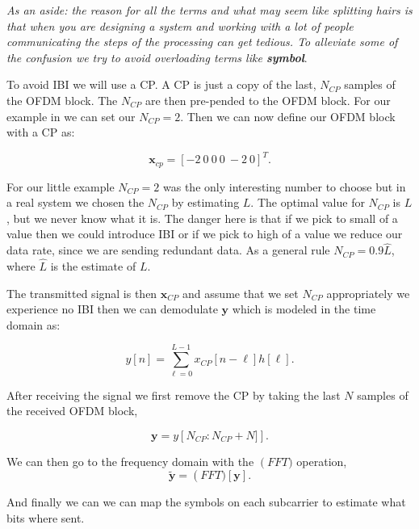 \emph{As an aside: the reason for all the terms and what may seem like splitting hairs is that when you are designing a system and working with a lot of people communicating the steps of the processing can get tedious. To alleviate some of the confusion we try to avoid overloading terms like \bf{symbol}}.

To avoid \ac{IBI} we will use a \ac{CP}. A \ac{CP} is just a copy of the last, $N_{CP}$ samples of the \ac{OFDM} block. The $N_{CP}$ are then pre-pended to the \ac{OFDM} block. For our example in  we can set our $N_{CP}=2$. Then we can now define our \ac{OFDM} block with a \ac{CP} as:

\begin{equation}
\mathbf{x}_{cp}= [-2~0~0~0~-2~0]^T.
\end{equation}

For our little example $N_{CP}=2$ was the only interesting number to choose but in a real system we chosen the $N_{CP}$ by estimating $L$. The optimal value for $N_{CP}$ is $L$, but we never know what it is. The danger here is that if we pick to small of a value then we could introduce \ac{IBI} or if we pick to high of a value we reduce our data rate, since we are sending redundant data. As a general rule $N_{CP}=0.9\hat{L}$, where $\hat{L}$ is the estimate of $L$.

The transmitted signal is then $\mathbf{x}_{CP}$ and assume that we set $N_{CP}$ appropriately we experience no \ac{IBI} then we can demodulate $\mathbf{y}$ which is modeled in the time domain as:

\begin{equation}
y[n] = \sum_{\ell=0}^{L-1}x_{CP}[n-\ell]h[\ell].
\end{equation}
\noindent

After receiving the signal we first remove the \ac{CP} by taking the last $N$ samples of the received \ac{OFDM} block,

\begin{equation}
\mathbf{y} = y\left[N_{CP}:N_{CP}+N]\right].
\end{equation}
\noindent

We can then go to the frequency domain with the $\operatorname(FFT)$ operation,
\begin{equation}
\label{eq:rxfft}
\tilde{\mathbf{y}} = \operatorname(FFT)\left[\mathbf{y}\right].
\end{equation}
\noindent

And finally we can we can map the symbols on each subcarrier to estimate what bits where sent.

